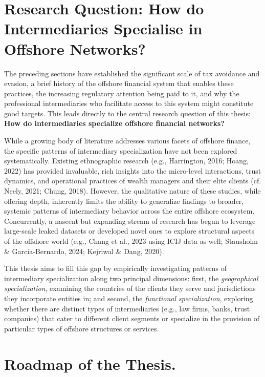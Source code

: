 \section{Research Question: How do Intermediaries Specialise in Offshore Networks?}
\label{sec:1_5}

The preceding sections have established the significant scale of tax avoidance and evasion, a brief history of the offshore financial system that enables these practices, the increasing regulatory attention being paid to it, and why the professional intermediaries who facilitate access to this system might constitute good targets. This leads directly to the central research question of this thesis: \textbf{How do intermediaries specialize offshore financial networks?}

While a growing body of literature addresses various facets of offshore finance, the specific patterns of intermediary specialization have not been explored systematically. Existing ethnographic research (e.g., Harrington, 2016; Hoang, 2022) has provided invaluable, rich insights into the micro-level interactions, trust dynamics, and operational practices of wealth managers and their elite clients (cf. Neely, 2021; Chung, 2018). However, the qualitative nature of these studies, while offering depth, inherently limits the ability to generalize findings to broader, systemic patterns of intermediary behavior across the entire offshore ecosystem. Concurrently, a nascent but expanding stream of research has begun to leverage large-scale leaked datasets or developed novel ones to explore structural aspects of the offshore world (e.g., Chang et al., 2023 using ICIJ data as well; Stausholm \& Garcia-Bernardo, 2024; Kejriwal \& Dang, 2020). 

This thesis aims to fill this gap by empirically investigating patterns of intermediary specialization along two principal dimensions: first, the \textit{geographical specialization}, examining the countries of the clients they serve and jurisdictions they incorporate entities in; and second, the \textit{functional specialization}, exploring whether there are distinct types of intermediaries (e.g., law firms, banks, trust companies) that cater to different client segments or specialize in the provision of particular types of offshore structures or services.

\section{Roadmap of the Thesis.}
\label{sec:1_6}

